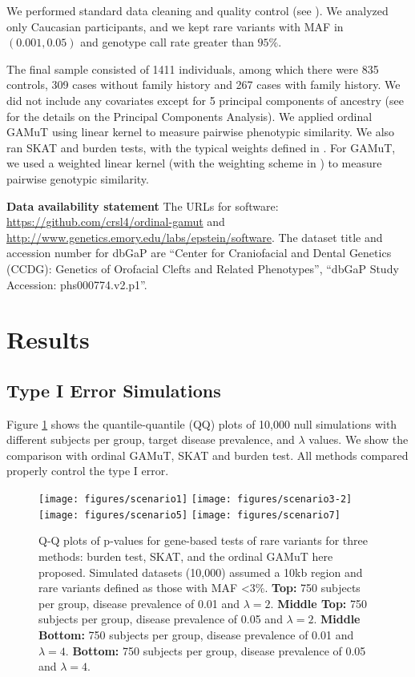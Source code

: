 \documentclass[]{article}
\theoremstyle{definition}
\theoremstyle{definition}
\theoremstyle{definition}
\theoremstyle{remark}
\begin{document}
We performed standard data cleaning and quality control (see
\citet{Leslie2016}). We analyzed only Caucasian participants, and we
kept rare variants with MAF in \((0.001,0.05)\) and genotype call rate
greater than \(95\%\).

The final sample consisted of 1411 individuals, among which there were
835 controls, 309 cases without family history and 267 cases with family
history. We did not include any covariates except for 5 principal
components of ancestry (see \citet{Leslie2016} for the details on the
Principal Components Analysis). We applied ordinal GAMuT using linear
kernel to measure pairwise phenotypic similarity. We also ran SKAT and
burden tests, with the typical weights defined in \citet{Wu2011}. For
GAMuT, we used a weighted linear kernel (with the weighting scheme in
\citet{Wu2011}) to measure pairwise genotypic similarity.

\textbf{Data availability statement } The URLs for software:
\url{https://github.com/crsl4/ordinal-gamut} and
\url{http://www.genetics.emory.edu/labs/epstein/software}. The dataset
title and accession number for dbGaP are ``Center for Craniofacial and
Dental Genetics (CCDG): Genetics of Orofacial Clefts and Related
Phenotypes'', ``dbGaP Study Accession: phs000774.v2.p1''.

\hypertarget{results}{%
\section{Results}\label{results}}

\hypertarget{type-i-error-simulations}{%
\subsection{Type I Error Simulations}\label{type-i-error-simulations}}

Figure \ref{fig:qq} shows the quantile-quantile (QQ) plots of 10,000
null simulations with different subjects per group, target disease
prevalence, and \(\lambda\) values. We show the comparison with ordinal
GAMuT, SKAT and burden test. All methods compared properly control the
type I error.

\begin{figure}

{\centering \texttt{[image: figures/scenario1]} \texttt{[image: figures/scenario3-2]} \texttt{[image: figures/scenario5]} \texttt{[image: figures/scenario7]} 

}

\caption{Q-Q plots of p-values for gene-based tests of rare variants for three methods: burden test, SKAT, and the ordinal GAMuT here proposed. Simulated datasets (10,000) assumed a 10kb region and rare variants defined as those with MAF <3\%. \textbf{Top:} 750 subjects per group,  disease prevalence of 0.01 and $\lambda=2$. \textbf{Middle Top:} 750 subjects per group, disease prevalence of 0.05 and $\lambda=2$. \textbf{Middle Bottom:} 750 subjects per group, disease prevalence of 0.01 and $\lambda=4$. \textbf{Bottom:} 750 subjects per group, disease prevalence of 0.05 and $\lambda=4$.}\label{fig:qq}
\end{figure}
\end{document}
